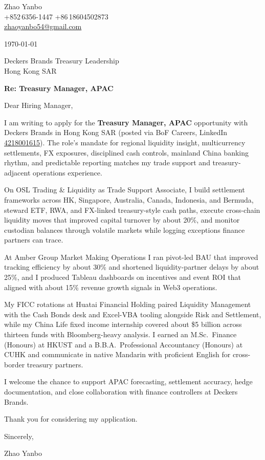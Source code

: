 \documentclass[10pt,a4paper]{article}
\begin{document}
\begin{flushleft}
  Zhao Yanbo\\
  +852\,6356-1447 \;\textbar\; +86\,18604502873\\
  \href{mailto:zhaoyanbo54@gmail.com}{zhaoyanbo54@gmail.com}
\end{flushleft}

\vspace{1em}

\begin{flushright}
  \today
\end{flushright}

\vspace{0.75em}

Deckers Brands Treasury Leadership\\
Hong Kong SAR

\vspace{1em}

\textbf{Re: Treasury Manager, APAC}

\vspace{0.75em}

Dear Hiring Manager,

I am writing to apply for the \textbf{Treasury Manager, APAC} opportunity with Deckers Brands in Hong Kong SAR (posted via BoF Careers, LinkedIn \href{https://www.linkedin.com/jobs/view/4218001615/}{4218001615}). The role's mandate for regional liquidity insight, multicurrency settlements, FX exposures, disciplined cash controls, mainland China banking rhythm, and predictable reporting matches my trade support and treasury-adjacent operations experience.

On OSL Trading \& Liquidity as Trade Support Associate, I build settlement frameworks across HK, Singapore, Australia, Canada, Indonesia, and Bermuda, steward ETF, RWA, and FX-linked treasury-style cash paths, execute cross-chain liquidity moves that improved capital turnover by about 20\%, and monitor custodian balances through volatile markets while logging exceptions finance partners can trace.

At Amber Group Market Making Operations I ran pivot-led BAU that improved tracking efficiency by about 30\% and shortened liquidity-partner delays by about 25\%, and I produced Tableau dashboards on incentives and event ROI that aligned with about 15\% revenue growth signals in Web3 operations.

My FICC rotations at Huatai Financial Holding paired Liquidity Management with the Cash Bonds desk and Excel-VBA tooling alongside Risk and Settlement, while my China Life fixed income internship covered about \$5 billion across thirteen funds with Bloomberg-heavy analysis. I earned an M.Sc.\ Finance (Honours) at HKUST and a B.B.A.\ Professional Accountancy (Honours) at CUHK and communicate in native Mandarin with proficient English for cross-border treasury partners.

I welcome the chance to support APAC forecasting, settlement accuracy, hedge documentation, and close collaboration with finance controllers at Deckers Brands.

Thank you for considering my application.

\vspace{1em}

Sincerely,

\vspace{2em}

Zhao Yanbo
\end{document}
